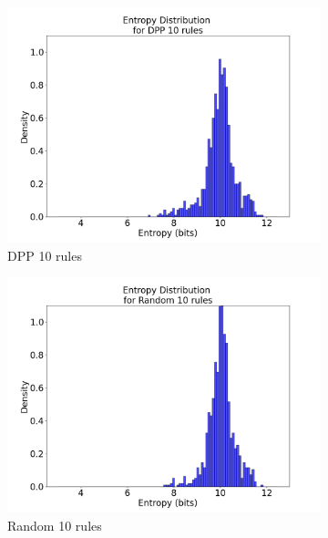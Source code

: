 \documentclass{article}
\begin{document}
\begin{figure}[H]
\centering

\begin{subfigure}{0.32\textwidth}
    \includegraphics[width=\linewidth]{figures/IMDB_entropy_distribution_plots/entropy_distribution_ft_10rules_dpp.png}
    \caption{DPP 10 rules}
\end{subfigure}\hfill
\begin{subfigure}{0.32\textwidth}
    \includegraphics[width=\linewidth]{figures/IMDB_entropy_distribution_plots/entropy_distribution_ft_10rules_randomC.png}
    \caption{Random 10 rules}
\end{subfigure}
\begin{subfigure}{0.32\textwidth}

\end{subfigure}
\end{figure}
\end{document}
